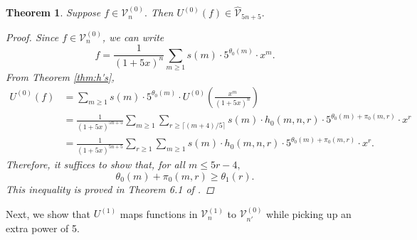 \documentclass[12pt, reqno]{amsart}
\newtheorem{thm}{Theorem}[section]
\theoremstyle{definition}
\theoremstyle{remark}
\begin{document}
\begin{thm}\label{thm:U0_Vhat}
Suppose $f \in \mathcal{V}_{n}^{(0)}.$ Then $U^{(0)}(f) \in \hat{\mathcal{V}}_{5n+5}.$
\begin{proof}
Since $f \in \mathcal{V}_n^{(0)}$, we can write
\[f = \frac{1}{(1+5x)^n} \sum\limits_{m \geq 1} s(m) \cdot 5^{\theta_0(m)} \cdot x^m.\]
From Theorem \ref{thm:h's},
\begin{align*}
U^{(0)}(f) &= \sum\limits_{m \geq 1} s(m) \cdot 5^{\theta_0(m)} \cdot U^{(0)} \left( \frac{x^m}{(1+5x)^n}\right) \\
&= \frac{1}{(1+5x)^{5n+5}} \sum\limits_{m \geq 1} \sum\limits_{r \geq \lceil (m+4)/5 \rceil} s(m) \cdot h_0(m,n,r) \cdot 5^{\theta_0(m) + \pi_0(m,r)} \cdot x^r \\
&= \frac{1}{(1+5x)^{5n+5}} \sum\limits_{r \geq 1} \sum\limits_{m \geq 1}  s(m) \cdot h_0(m,n,r) \cdot 5^{\theta_0(m) + \pi_0(m,r)} \cdot x^r.
\end{align*}
Therefore, it suffices to show that, for all $m\leq 5r-4,$
\[\theta_0(m) + \pi_0(m,r) \geq \theta_1(r).\]
This inequality is proved in Theorem 6.1 of \cite{BS}. 
\end{proof}
\end{thm}

Next, we show that $U^{(1)}$ maps functions in $\mathcal{V}_n^{(1)}$ to $\mathcal{V}_{n'}^{(0)}$ while picking up an extra power of 5. 
\end{document}
